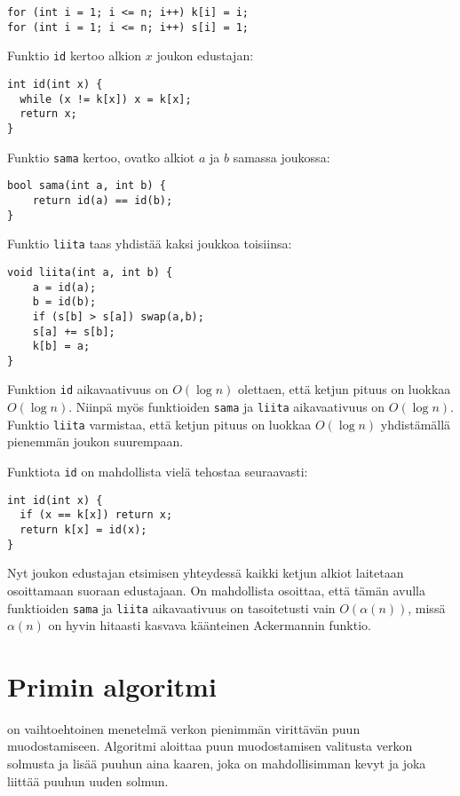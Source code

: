 \begin{lstlisting}
for (int i = 1; i <= n; i++) k[i] = i;
for (int i = 1; i <= n; i++) s[i] = 1;
\end{lstlisting}

Funktio \texttt{id} kertoo alkion $x$
joukon edustajan:

\begin{lstlisting}
int id(int x) {
  while (x != k[x]) x = k[x];
  return x;
}
\end{lstlisting}

Funktio \texttt{sama} kertoo,
ovatko alkiot $a$ ja $b$ samassa joukossa:

\begin{lstlisting}
bool sama(int a, int b) {
    return id(a) == id(b);
}
\end{lstlisting}

Funktio \texttt{liita} taas yhdistää
kaksi joukkoa toisiinsa:

\begin{lstlisting}
void liita(int a, int b) {
    a = id(a);
    b = id(b);
    if (s[b] > s[a]) swap(a,b);
    s[a] += s[b];
    k[b] = a;
}
\end{lstlisting}

Funktion \texttt{id} aikavaativuus on $O(\log n)$
olettaen, että ketjun pituus on luokkaa $O(\log n)$.
Niinpä myös funktioiden \texttt{sama} ja \texttt{liita}
aikavaativuus on $O(\log n)$.
Funktio \texttt{liita} varmistaa,
että ketjun pituus on luokkaa $O(\log n)$
yhdistämällä pienemmän joukon suurempaan.

Funktiota \texttt{id} on mahdollista vielä tehostaa
seuraavasti:

\begin{lstlisting}
int id(int x) {
  if (x == k[x]) return x;
  return k[x] = id(x);
}
\end{lstlisting}

Nyt joukon edustajan etsimisen yhteydessä kaikki ketjun
alkiot laitetaan osoittamaan suoraan edustajaan.
On mahdollista osoittaa, että tämän avulla
funktioiden \texttt{sama} ja \texttt{liita}
aikavaativuus on tasoitetusti
vain $O(\alpha(n))$, missä $\alpha(n)$ on
hyvin hitaasti kasvava käänteinen Ackermannin funktio.

\section{Primin algoritmi}


 on vaihtoehtoinen menetelmä
verkon pienimmän virittävän puun muodostamiseen.
Algoritmi aloittaa puun muodostamisen valitusta
verkon solmusta ja lisää puuhun aina kaaren,
joka on mahdollisimman kevyt ja joka
liittää puuhun uuden solmun.

